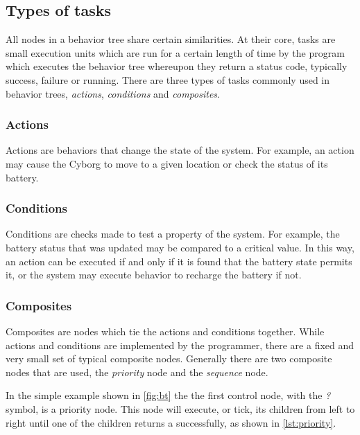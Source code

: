 \documentclass[\rootfolder/main.tex]{subfiles}
\begin{document}

\subsection{Types of tasks}

All nodes in a behavior tree share certain similarities.
At their core, tasks are small execution units which are run for a certain length of time by the program which executes the behavior tree whereupon they return a status code, typically success, failure or running.
There are three types of tasks commonly used in behavior trees, \emph{actions}, \emph{conditions} and \emph{composites}.

\subsubsection{Actions}

Actions are behaviors that change the state of the system.
For example, an action may cause the Cyborg to move to a given location or check the status of its battery.

\subsubsection{Conditions}

Conditions are checks made to test a property of the system.
For example, the battery status that was updated may be compared to a critical value.
In this way, an action can be executed if and only if it is found that the battery state permits it, or the system may execute behavior to recharge the battery if not.

\subsubsection{Composites}

Composites are nodes which tie the actions and conditions together.
While actions and conditions are implemented by the programmer, there are a fixed and very small set of typical composite nodes.
Generally there are two composite nodes that are used, the \emph{priority} node and the \emph{sequence} node.

In the simple example shown in \cref{fig:bt} the the first control node, with the \emph{?} symbol, is a priority node.
This node will execute, or tick, its children from left to right until one of the children returns a successfully, as shown in \cref{lst:priority}.
\end{document}
